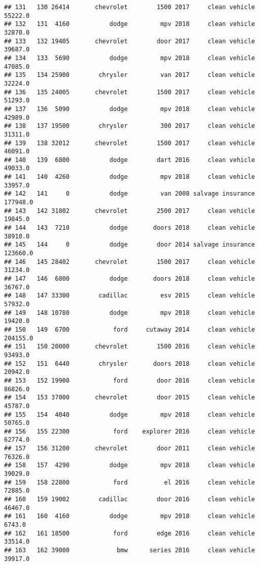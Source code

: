 \documentclass[
]{article}
\begin{document}
\begin{verbatim}
## 131   130 26414       chevrolet        1500 2017     clean vehicle   55222.0
## 132   131  4160           dodge         mpv 2018     clean vehicle   32870.0
## 133   132 19405       chevrolet        door 2017     clean vehicle   39687.0
## 134   133  5690           dodge         mpv 2018     clean vehicle   47085.0
## 135   134 25900        chrysler         van 2017     clean vehicle   32224.0
## 136   135 24005       chevrolet        1500 2017     clean vehicle   51293.0
## 137   136  5090           dodge         mpv 2018     clean vehicle   42989.0
## 138   137 19500        chrysler         300 2017     clean vehicle   31311.0
## 139   138 32012       chevrolet        1500 2017     clean vehicle   46091.0
## 140   139  6800           dodge        dart 2016     clean vehicle   49033.0
## 141   140  4260           dodge         mpv 2018     clean vehicle   33957.0
## 142   141     0           dodge         van 2008 salvage insurance  177948.0
## 143   142 31802       chevrolet        2500 2017     clean vehicle   19845.0
## 144   143  7210           dodge       doors 2018     clean vehicle   38910.0
## 145   144     0           dodge        door 2014 salvage insurance  123660.0
## 146   145 28402       chevrolet        1500 2017     clean vehicle   31234.0
## 147   146  6800           dodge       doors 2018     clean vehicle   36767.0
## 148   147 33300        cadillac         esv 2015     clean vehicle   57932.0
## 149   148 10780           dodge         mpv 2018     clean vehicle   19420.0
## 150   149  6700            ford     cutaway 2014     clean vehicle  204155.0
## 151   150 20000       chevrolet        1500 2016     clean vehicle   93493.0
## 152   151  6440        chrysler       doors 2018     clean vehicle   20942.0
## 153   152 19900            ford        door 2016     clean vehicle   86826.0
## 154   153 37000       chevrolet        door 2015     clean vehicle   45787.0
## 155   154  4040           dodge         mpv 2018     clean vehicle   50765.0
## 156   155 22300            ford    explorer 2016     clean vehicle   62774.0
## 157   156 31200       chevrolet        door 2011     clean vehicle   76326.0
## 158   157  4290           dodge         mpv 2018     clean vehicle   39029.0
## 159   158 22800            ford          el 2016     clean vehicle   72885.0
## 160   159 19002        cadillac        door 2016     clean vehicle   46467.0
## 161   160  4160           dodge         mpv 2018     clean vehicle    6743.0
## 162   161 18500            ford        edge 2016     clean vehicle   33514.0
## 163   162 39000             bmw      series 2016     clean vehicle   39917.0

\end{verbatim}
\end{document}
